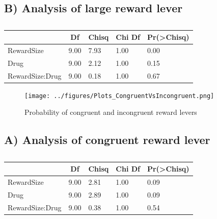 \documentclass[
]{article}
\begin{document}
\hypertarget{b-analysis-of-large-reward-lever}{%
\subsection{B) Analysis of large reward
lever}\label{b-analysis-of-large-reward-lever}}

\begin{table}[tbp]

\begin{center}
\begin{threeparttable}

\caption{\label{tab:Analysis 2: Probability of both levers }}

\begin{tabular}{lllll}
\toprule
 & \multicolumn{1}{c}{Df} & \multicolumn{1}{c}{Chisq} & \multicolumn{1}{c}{Chi Df} & \multicolumn{1}{c}{Pr(>Chisq)}\\
\midrule
RewardSize & 9.00 & 7.93 & 1.00 & 0.00\\
Drug & 9.00 & 2.12 & 1.00 & 0.15\\
RewardSize:Drug & 9.00 & 0.18 & 1.00 & 0.67\\
\bottomrule
\end{tabular}

\end{threeparttable}
\end{center}

\end{table}

\begin{figure}
\centering
\texttt{[image: ../figures/Plots\_CongruentVsIncongruent.png]}
\caption{Probability of congruent and incongruent reward levers}
\end{figure}

\hypertarget{a-analysis-of-congruent-reward-lever}{%
\subsection{A) Analysis of congruent reward
lever}\label{a-analysis-of-congruent-reward-lever}}

\begin{table}[tbp]

\begin{center}
\begin{threeparttable}

\caption{\label{tab:Analysis 2: Probability of both levers }}

\begin{tabular}{lllll}
\toprule
 & \multicolumn{1}{c}{Df} & \multicolumn{1}{c}{Chisq} & \multicolumn{1}{c}{Chi Df} & \multicolumn{1}{c}{Pr(>Chisq)}\\
\midrule
RewardSize & 9.00 & 2.81 & 1.00 & 0.09\\
Drug & 9.00 & 2.89 & 1.00 & 0.09\\
RewardSize:Drug & 9.00 & 0.38 & 1.00 & 0.54\\
\bottomrule
\end{tabular}

\end{threeparttable}
\end{center}

\end{table}
\end{document}
